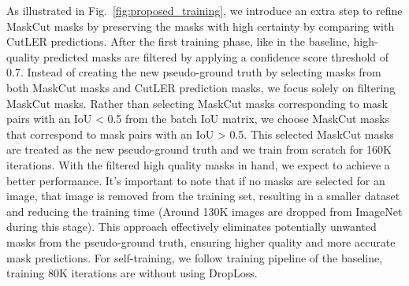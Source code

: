 As illustrated in Fig.~\ref{fig:proposed_training}, we introduce an extra step to refine MaskCut masks by preserving the masks with high certainty by comparing with CutLER predictions. After the first training phase, like in the baseline, high-quality predicted masks are filtered by applying a confidence score threshold of 0.7. Instead of creating the new pseudo-ground truth by selecting masks from both MaskCut masks and CutLER prediction masks, we focus solely on filtering MaskCut masks. Rather than selecting MaskCut masks corresponding to mask pairs with an IoU < 0.5 from the batch IoU matrix, we choose MaskCut masks that correspond to mask pairs with an IoU > 0.5. This selected MaskCut masks are treated as the new pseudo-ground truth and we train from scratch for 160K iterations. With the filtered high quality masks in hand, we expect to achieve a better performance. It’s important to note that if no masks are selected for an image, that image is removed from the training set, resulting in a smaller dataset and reducing the training time (Around 130K images are dropped from ImageNet during this stage). This approach effectively eliminates potentially unwanted masks from the pseudo-ground truth, ensuring higher quality and more accurate mask predictions. For self-training, we follow training pipeline of the baseline, training 80K iterations are without using DropLoss.

